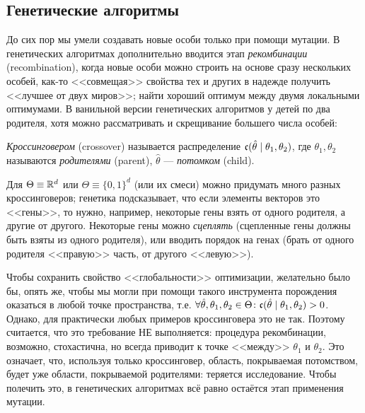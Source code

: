 \subsection{Генетические алгоритмы}

До сих пор мы умели создавать новые особи только при помощи мутации. В генетических алгоритмах дополнительно вводится этап \emph{рекомбинации} (recombination), когда новые особи можно строить на основе сразу нескольких особей, как-то <<совмещая>> свойства тех и других в надежде получить <<лучшее от двух миров>>; найти хороший оптимум между двумя локальными оптимумами. В ванильной версии генетических алгоритмов у детей по два родителя, хотя можно рассматривать и скрещивание большего числа особей:

\newcommand{\cross}{\mathfrak{c}}
\begin{definition}
\emph{Кроссинговером} (crossover) называется распределение $\cross(\hat{\theta} \HM\mid \theta_1, \theta_2)$, где $\theta_1, \theta_2$ называются \emph{родителями} (parent), $\hat{\theta}$ --- \emph{потомком} (child).
\end{definition}

\begin{example}
Для $\Theta \equiv \mathbb{R}^d$ или $\Theta \equiv \{0, 1\}^d$ (или их смеси) можно придумать много разных кроссинговеров; генетика подсказывает, что если элементы векторов это <<гены>>, то нужно, например, некоторые гены взять от одного родителя, а другие от другого. Некоторые гены можно \emph{сцеплять} (сцепленные гены должны быть взяты из одного родителя), или вводить порядок на генах (брать от одного родителя <<правую>> часть, от другого <<левую>>).
\end{example}

Чтобы сохранить свойство <<глобальности>> оптимизации, желательно было бы, опять же, чтобы мы могли при помощи такого инструмента порождения оказаться в любой точке пространства, т.е. $\forall \hat{\theta}, \theta_1, \theta_2 \HM\in \Theta \colon \cross(\hat{\theta} \HM\mid \theta_1, \theta_2) > 0$. Однако, для практически любых примеров кроссинговера это не так. Поэтому считается, что это требование НЕ выполняется: процедура рекомбинации, возможно, стохастична, но всегда приводит к точке <<между>> $\theta_1$ и $\theta_2$. Это означает, что, используя только кроссинговер, область, покрываемая потомством, будет уже области, покрываемой родителями: теряется исследование. Чтобы полечить это, в генетических алгоритмах всё равно остаётся этап применения мутации.


